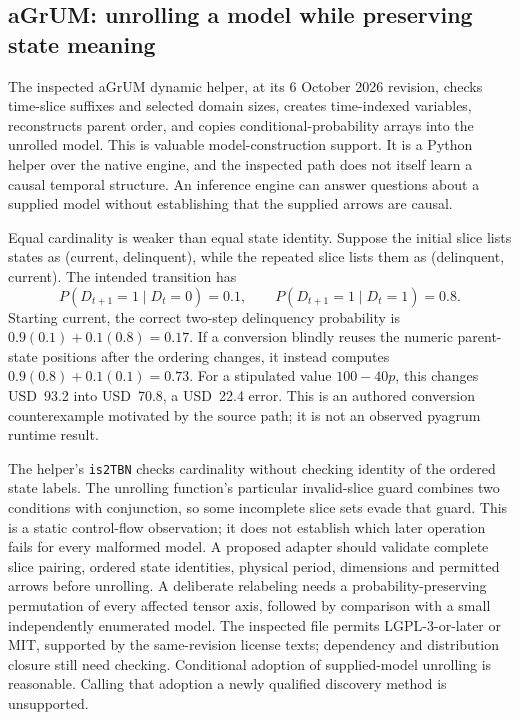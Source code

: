 \subsection{aGrUM: unrolling a model while preserving state meaning}

The inspected aGrUM dynamic helper, at its 6 October 2026 revision, checks
time-slice suffixes and selected domain sizes, creates time-indexed variables,
reconstructs parent order, and copies conditional-probability arrays into the
unrolled model. This is valuable model-construction support. It is a Python
helper over the native engine, and the inspected path does not itself learn
a causal temporal structure. An inference engine can answer questions about
a supplied model without establishing that the supplied arrows are causal.
\citep{exec16_ct_agrum}

Equal cardinality is weaker than equal state identity. Suppose the initial
slice lists states as (current, delinquent), while the repeated slice lists
them as (delinquent, current). The intended transition has
\[
 P(D_{t+1}=1\mid D_t=0)=0.1,\qquad
 P(D_{t+1}=1\mid D_t=1)=0.8.
\]
Starting current, the correct two-step delinquency probability is
$0.9(0.1)+0.1(0.8)=0.17$. If a conversion blindly reuses the numeric
parent-state positions after the ordering changes, it instead computes
$0.9(0.8)+0.1(0.1)=0.73$. For a stipulated value $100-40p$, this changes
USD~93.2 into USD~70.8, a USD~22.4 error. This is an authored conversion
counterexample motivated by the source path; it is not an observed pyagrum
runtime result. \citep{exec16_ct_oracle}

The helper's \texttt{is2TBN} checks cardinality without checking identity of
the ordered state labels. The unrolling function's particular invalid-slice
guard combines two conditions with conjunction, so some incomplete slice
sets evade that guard. This is a static control-flow observation; it does not
establish which later operation fails for every malformed model. A proposed
adapter should validate complete slice pairing, ordered state identities,
physical period, dimensions and permitted arrows before unrolling. A
deliberate relabeling needs a probability-preserving permutation of every
affected tensor axis, followed by comparison with a small independently
enumerated model. The inspected file permits LGPL-3-or-later or MIT, supported
by the same-revision license texts; dependency and distribution closure still
need checking. Conditional adoption of supplied-model unrolling is reasonable.
Calling that adoption a newly qualified discovery method is unsupported.
\citep{exec16_ct_agrum,exec16_ct_design}

